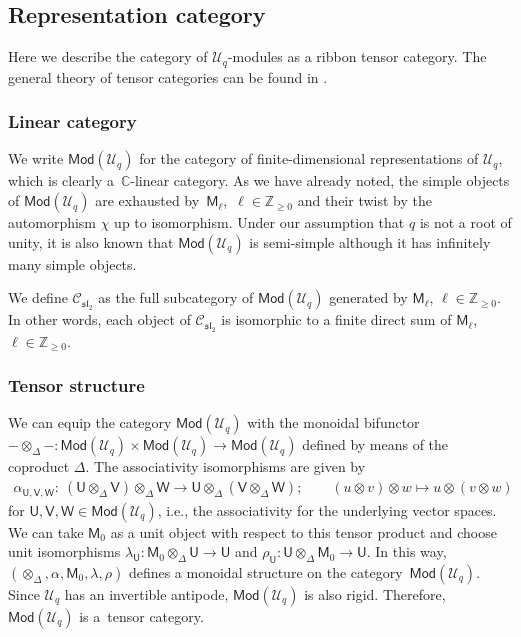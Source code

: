 \documentclass[10pt,a4paper]{amsart}
\numberwithin{equation}{section}
\newcommand{\catMod}{\mathsf{Mod}}
\newcommand{\bC}{\mathbb{C}}
\newcommand{\bZ}{\mathbb{Z}}
\newcommand{\cC}{\mathcal{C}}
\newcommand{\cU}{\mathcal{U}}
\newcommand{\fsl}{\mathfrak{sl}}
\newcommand{\sfM}{\mathsf{M}}
\newcommand{\sfU}{\mathsf{U}}
\newcommand{\sfV}{\mathsf{V}}
\newcommand{\sfW}{\mathsf{W}}
\newcommand{\UEA}{\cU}
\newcommand{\Uq}{\UEA_{q}}
\newcommand{\QGirrep}[1]{\sfM_{#1}}
\newcommand{\QGcoprod}{\Delta}
\newcommand{\catQG}{\cC_{\fsl_{2}}}
\newcommand{\QGrepU}{\sfU}
\newcommand{\QGrepV}{\sfV}
\newcommand{\QGrepW}{\sfW}
\begin{document}
\subsection{Representation category}
Here we describe the category of $\Uq$-modules as a ribbon tensor category.
The general theory of tensor categories can be found in \cite{BakalovKirillovJr2001,etingof2015tensor}.

\subsubsection{Linear category}
We write $\catMod (\Uq)$ for the category of finite-dimensional representations of $\Uq$, which is clearly a~$\bC$-linear category.
As we have already noted, the simple objects of $\catMod(\Uq)$ are exhausted by~$\QGirrep{\ell}$,~$\ell\in\bZ_{\geq 0}$ and their twist by the automorphism $\chi$ up to isomorphism.
Under our assumption that $q$ is not a root of unity, it is also known that $\catMod(\Uq)$ is semi-simple although it has infinitely many simple objects.

We define $\catQG$ as the full subcategory of $\catMod(\Uq)$ generated by $\QGirrep{\ell}$, $\ell\in\bZ_{\geq 0}$.
In other words, each object of $\catQG$ is isomorphic to a finite direct sum of $\QGirrep{\ell}$, $\ell\in\bZ_{\geq 0}$.

\subsubsection{Tensor structure}
We can equip the category $\catMod (\Uq)$ with the monoidal bifunctor $-\otimes_{\QGcoprod}-\colon \catMod(\Uq)\times\catMod(\Uq)\to \catMod(\Uq)$ defined by means of the coproduct $\QGcoprod$.
The associativity isomorphisms are given by
\begin{gather*}
 \alpha_{\QGrepU,\QGrepV,\QGrepW}\colon\ (\QGrepU\otimes_{\QGcoprod}\QGrepV)\otimes_{\QGcoprod} \QGrepW\to \QGrepU\otimes_{\QGcoprod} (\QGrepV\otimes_{\QGcoprod}\QGrepW);\qquad (u\otimes v)\otimes w\mapsto u\otimes (v\otimes w)
\end{gather*}
for $\QGrepU,\QGrepV,\QGrepW\in\catMod (\Uq)$,
i.e., the associativity for the underlying vector spaces.
We can take $\QGirrep{0}$ as a unit object with respect to this tensor product and choose unit isomorphisms $\lambda_{\QGrepU}\colon \QGirrep{0}\otimes_{\QGcoprod} \QGrepU\to\QGrepU$ and $\rho_{\QGrepU}\colon \QGrepU\otimes_{\QGcoprod}\QGirrep{0}\to\QGrepU$.
In this way, $(\otimes_{\QGcoprod},\alpha,\QGirrep{0},\lambda,\rho)$ defines a monoidal structure on the category~$\catMod (\Uq)$.
Since $\Uq$ has an invertible antipode, $\catMod(\Uq)$ is also rigid.
Therefore, $\catMod(\Uq)$ is a~tensor category.
\end{document}
